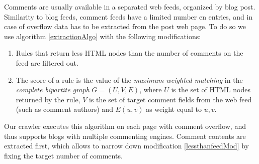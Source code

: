 Comments are usually available in a separated web feeds, organized by blog post. Similarity to blog feeds, comment feeds have a limited number en entries, and in case of overflow data has to be extracted from the post web page. To do so we use algorithm \ref{extractionAlgo} with the following modifications:
\begin{enumerate}
  \item\label{lessthanfeedMod} Rules that return less HTML nodes than the number of comments on the feed are filtered out.
  \item\label{assignmentMod} The score of a rule is the value of the \emph{maximum weighted matching} in the \emph{complete bipartite graph} $G = (U, V, E)$, where $U$ is the set of HTML nodes returned by the rule, $V$ is the set of target comment fields from the web feed (such as comment authors) and $E(u, v)$ as weight equal to \code{\ref{similarityAlgo}(}$u, v$\code{)}.
\end{enumerate}
Our crawler executes this algorithm on each page with comment overflow, and thus supports blogs with multiple commenting engines. Comment contents are extracted first, which allows to narrow down modification \ref{lessthanfeedMod} by fixing the target number of comments.
